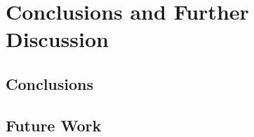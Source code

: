 \documentclass[12pt]{report}
\theoremstyle{plain}
\theoremstyle{definition}
\begin{document}


\newpage
\chapter{Conclusions and Further Discussion}

\section{Conclusions}

\section{Future Work}


\printbibliography
\end{document}
